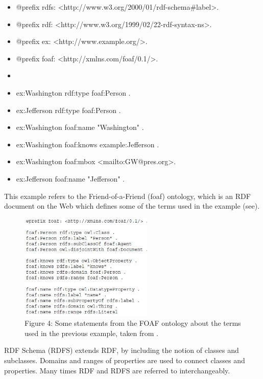 \documentclass[10pt,journal,compsoc]{IEEEtran}
\begin{document}
\begin{itemize}
\item[]@prefix rdfs:  \textless http://www.w3.org/2000/01/rdf-schema\#label\textgreater .
\item[]@prefix rdf:  \textless http://www.w3.org/1999/02/22-rdf-syntax-ns\textgreater .
  \item[]@prefix ex:  \textless http://www.example.org/\textgreater .
  \item[]@prefix foaf:  \textless http://xmlns.com/foaf/0.1/\textgreater .
  \item[] 
  \item[] ex:Washington rdf:type foaf:Person .
 \item[] ex:Jefferson rdf:type foaf:Person .
 \item[] ex:Washington foaf:name "Washington" .
 \item[] ex:Washington foaf:knows example:Jefferson .
 \item[] ex:Washington foaf:mbox \textless mailto:GW@pres.org\textgreater .
 \item[] ex:Jefferson foaf:name "Jefferson" .
\end{itemize}


This example refers to the Friend-of-a-Friend (foaf) ontology, which is an RDF document on the Web which defines some of the terms used in the example (see\cite{foaf}).


\begin{figure}[htbp] %
   \centering
   \includegraphics[width=2.5in]{StmtsFromFOAF.jpg} 
  \caption*{Figure 4: Some statements from the FOAF ontology about the terms used in the previous example, taken from \cite{_social_2007}.}
   \label{}
\label{}   
\end{figure}



RDF Schema (RDFS) extends RDF, by including the notion of classes and subclasses.  Domains and ranges of properties are used to connect classes and properties.  Many times RDF and RDFS are referred to interchangeably.
\end{document}
